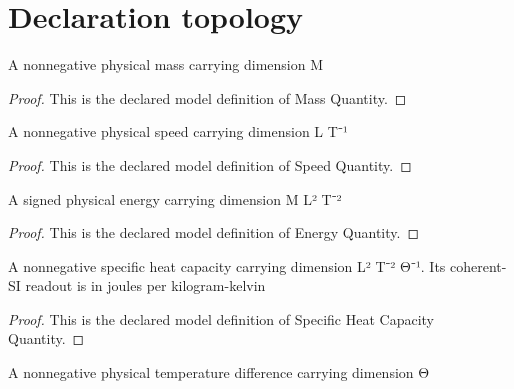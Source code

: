 \section{Declaration topology}
\begin{definition}
  \label{def:physics:phyx-mini-0486:phyxminiproblems-problemphyxmini0486-massquantity}
  A nonnegative physical mass carrying dimension M
\end{definition}
\begin{proof}
  This is the declared model definition of Mass Quantity.
\end{proof}
\begin{definition}
  \label{def:physics:phyx-mini-0486:phyxminiproblems-problemphyxmini0486-speedquantity}
  A nonnegative physical speed carrying dimension L T⁻¹
\end{definition}
\begin{proof}
  This is the declared model definition of Speed Quantity.
\end{proof}
\begin{definition}
  \label{def:physics:phyx-mini-0486:phyxminiproblems-problemphyxmini0486-energyquantity}
  A signed physical energy carrying dimension M L² T⁻²
\end{definition}
\begin{proof}
  This is the declared model definition of Energy Quantity.
\end{proof}
\begin{definition}
  \label{def:physics:phyx-mini-0486:phyxminiproblems-problemphyxmini0486-specificheatcapacityquantity}
  A nonnegative specific heat capacity carrying dimension L² T⁻² Θ⁻¹. Its coherent-SI readout is in joules per kilogram-kelvin
\end{definition}
\begin{proof}
  This is the declared model definition of Specific Heat Capacity Quantity.
\end{proof}
\begin{definition}
  \label{def:physics:phyx-mini-0486:phyxminiproblems-problemphyxmini0486-temperaturedifferencequantity}
  A nonnegative physical temperature difference carrying dimension Θ
\end{definition}
